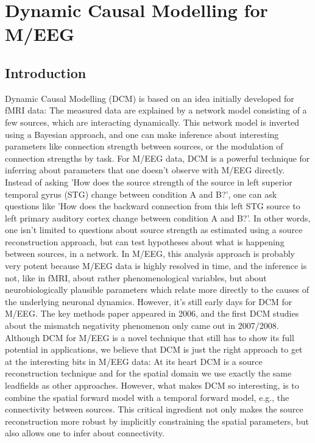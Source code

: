 \chapter{Dynamic Causal Modelling for M/EEG \label{Chap:eeg:DCM}}

\section{Introduction}
Dynamic Causal Modelling (DCM) is based on an idea initially developed for fMRI
data: The measured data are explained by a network model consisting of
a few sources, which are interacting dynamically. This network model
is inverted using a Bayesian approach, and one can make inference
about interesting parameters like connection strength between sources,
or the modulation of connection strengths by task. For M/EEG data, DCM
is a powerful technique for inferring about parameters that one
doesn't observe with M/EEG directly. Instead of asking 'How does the
source strength of the source in left superior temporal gyrus (STG) change
between condition A and B?', one can ask questions like 'How does the backward
connection from this left STG source to left primary auditory cortex
change between condition A and B?'. In other words, one isn't limited
to questions about source strength as estimated using a source
reconstruction approach, but can test hypotheses about what is
happening between sources, in a network. In M/EEG, this analysis
approach is probably very potent because M/EEG data is highly resolved
in time, and the inference is not, like in fMRI, about rather
phenomenological variables, but about neurobiologically plausible
parameters which relate more directly to the causes of the underlying 
neuronal dynamics. However, it's still early days for DCM for
M/EEG. The key methods paper appeared in 2006, and the
first DCM studies about the mismatch negativity phenomenon only came out
in 2007/2008. Although DCM for M/EEG is a novel technique that still
has to show its full potential in applications, we believe that DCM is
just the right approach to get at the interesting bits in M/EEG
data: At its heart DCM is a source reconstruction technique and for
the spatial domain we use exactly the same leadfields as other
approaches. However, what makes DCM so interesting, is to combine the
spatial forward model with a temporal forward model, e.g., the
connectivity between sources. This critical ingredient not only makes
the source reconstruction more robust by implicitly constraining the
spatial parameters, but also allows one to infer about connectivity.
